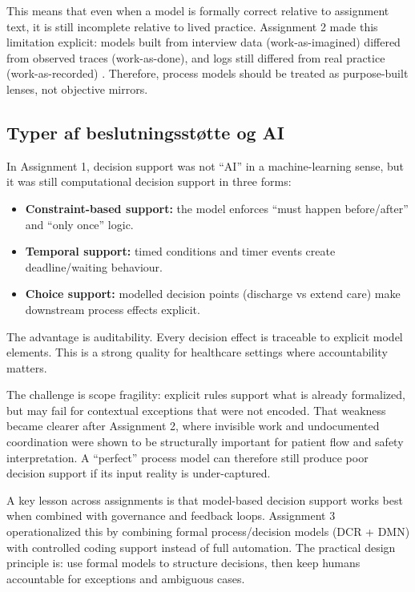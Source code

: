 This means that even when a model is formally correct relative to assignment text, it is still incomplete relative to lived practice. Assignment 2 made this limitation explicit: models built from interview data (work-as-imagined) differed from observed traces (work-as-done), and logs still differed from real practice (work-as-recorded) \parencite{guidehealthinformatics2026ch27,zajac2026methodsknowing}. Therefore, process models should be treated as purpose-built lenses, not objective mirrors.

\subsection{Typer af beslutningsstøtte og AI}
\label{subsec:process_beslutningsstoette_ai}

In Assignment 1, decision support was not ``AI'' in a machine-learning sense, but it was still computational decision support in three forms:
\begin{itemize}
    \item \textbf{Constraint-based support:} the model enforces ``must happen before/after'' and ``only once'' logic.
    \item \textbf{Temporal support:} timed conditions and timer events create deadline/waiting behaviour.
    \item \textbf{Choice support:} modelled decision points (discharge vs extend care) make downstream process effects explicit.
\end{itemize}

The advantage is auditability. Every decision effect is traceable to explicit model elements. This is a strong quality for healthcare settings where accountability matters.

The challenge is scope fragility: explicit rules support what is already formalized, but may fail for contextual exceptions that were not encoded. That weakness became clearer after Assignment 2, where invisible work and undocumented coordination were shown to be structurally important for patient flow and safety interpretation. A ``perfect'' process model can therefore still produce poor decision support if its input reality is under-captured.

A key lesson across assignments is that model-based decision support works best when combined with governance and feedback loops. Assignment 3 operationalized this by combining formal process/decision models (DCR + DMN) with controlled coding support instead of full automation. The practical design principle is: use formal models to structure decisions, then keep humans accountable for exceptions and ambiguous cases.

